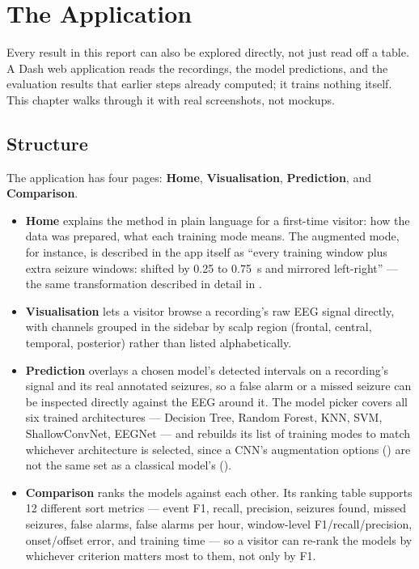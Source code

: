 \chapter{The Application}
\label{chap:application}

Every result in this report can also be explored directly, not just read off a table. A Dash
web application reads the recordings, the model predictions, and the evaluation results that
earlier steps already computed; it trains nothing itself. This chapter walks through it with
real screenshots, not mockups.

\section{Structure}

The application has four pages: \textbf{Home}, \textbf{Visualisation}, \textbf{Prediction}, and
\textbf{Comparison}.

\begin{itemize}[leftmargin=1.4em]
  \item \textbf{Home} explains the method in plain language for a first-time visitor: how the
    data was prepared, what each training mode means. The augmented mode, for instance, is
    described in the app itself as ``every training window plus extra seizure windows: shifted
    by 0.25 to 0.75~s and mirrored left-right'' --- the same transformation described in detail
    in .
  \item \textbf{Visualisation} lets a visitor browse a recording's raw EEG signal directly, with
    channels grouped in the sidebar by scalp region (frontal, central, temporal, posterior)
    rather than listed alphabetically.
  \item \textbf{Prediction} overlays a chosen model's detected intervals on a recording's signal
    and its real annotated seizures, so a false alarm or a missed seizure can be inspected
    directly against the EEG around it. The model picker covers all six trained architectures
    --- Decision Tree, Random Forest, KNN, SVM, ShallowConvNet, EEGNet --- and rebuilds its list
    of training modes to match whichever architecture is selected, since a CNN's augmentation
    options () are not the same set as a classical model's
    ().
  \item \textbf{Comparison} ranks the models against each other. Its ranking table supports 12
    different sort metrics --- event F1, recall, precision, seizures found, missed seizures,
    false alarms, false alarms per hour, window-level F1/recall/precision, onset/offset error,
    and training time --- so a visitor can re-rank the models by whichever criterion matters
    most to them, not only by F1.
\end{itemize}

